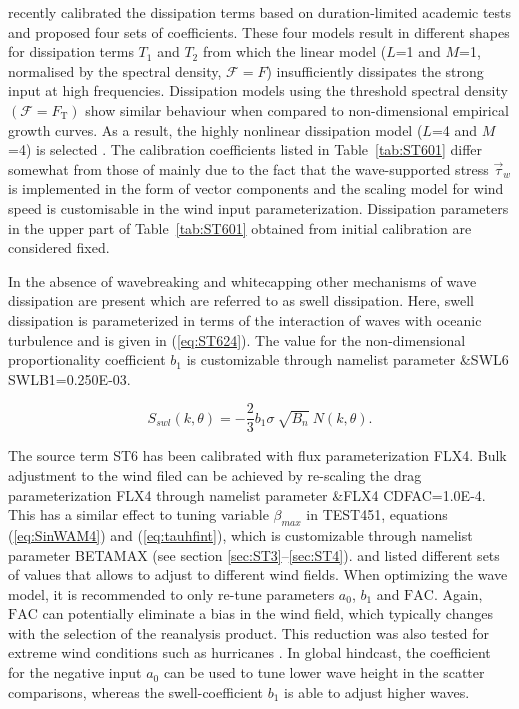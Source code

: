 \citet{art:RBW12} recently calibrated the dissipation terms based
on duration-limited academic tests and proposed four sets of coefficients.
These four models result in different shapes for dissipation terms
$T_1$ and $T_2$ from which the linear model ($L$=1 and $M$=1, normalised by the 
spectral density, $\mathcal{F}=F$) insufficiently dissipates the strong 
input at high frequencies. Dissipation models 
using the threshold spectral density $(\mathcal{F}=F_{\mathrm{T}})$ show 
similar behaviour when compared to non-dimensional empirical growth curves. 
As a result, the highly nonlinear dissipation model ($L$=4 and $M$=4) is 
selected \citep{art:RBW12}. The calibration coefficients listed 
in Table~\ref{tab:ST601} differ somewhat from those of \citet{art:RBW12} 
mainly due to the fact that the wave-supported stress $\vec{\tau}_w$ 
is implemented in the form of vector components and the scaling model 
for wind speed is customisable in the wind input parameterization.
Dissipation parameters in the upper part of  Table~\ref{tab:ST601}
obtained from initial calibration are considered fixed.

In the absence of wavebreaking and whitecapping other mechanisms 
of wave dissipation are present which are referred to as swell 
dissipation. Here, swell dissipation is parameterized in 
terms of the interaction of waves with oceanic turbulence \citep{bk:B11} 
and is given in (\ref{eq:ST624}). The value for the non-dimensional
proportionality coefficient $b_1$ is customizable through namelist
parameter {\code \&SWL6 SWLB1=0.250E-03}.

\begin{equation}\label{eq:ST624}
  S_{swl}(k,\theta) = -\frac{2}{3}b_1 \sigma\ \sqrt{B_n}\ N(k,\theta).
\end{equation}


The source term {\code ST6} has been calibrated with flux parameterization 
{\code FLX4}. Bulk adjustment to the wind filed can be achieved by 
re-scaling the drag parameterization {\code FLX4} through namelist 
parameter {\code \&FLX4 CDFAC=1.0E-4}. 
This has a similar effect to tuning variable $\beta_{max}$ in TEST451, equations
(\ref{eq:SinWAM4}) and (\ref{eq:tauhfint}), which is customizable through 
namelist parameter {\code BETAMAX} (see section \ref{sec:ST3}--\ref{sec:ST4}). 
\citet{pro:Aea11} and \citet{art:RA13} listed different 
sets of values that allows to adjust to different wind fields. When 
optimizing the wave model, it is recommended to only re-tune parameters
$a_0$, $b_1$ and $\mathrm{FAC}$. Again, $\mathrm{FAC}$ can potentially 
eliminate a bias in the wind field, which typically changes with the
selection of the reanalysis product. This reduction was also tested 
for extreme wind conditions such as hurricanes \citep{art:ZBRY13}. 
In global hindcast, the coefficient for the negative input $a_0$ can 
be used to tune lower wave height in the scatter comparisons, whereas 
the swell-coefficient $b_1$ is able to adjust higher waves. 

